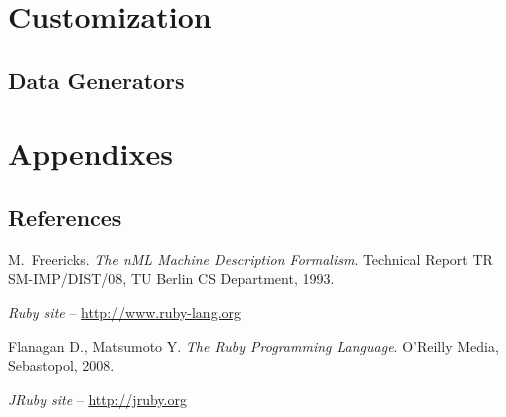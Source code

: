 \documentclass[oneside,final,12pt]{extreport}
\begin{document}
\chapter{Customization}

\section{Data Generators}


\chapter{Appendixes}

\section{References}



\begin{thebibliography}{1}

M.~Freericks.
\emph{The nML Machine Description Formalism}.
Technical Report TR SM-IMP/DIST/08, TU Berlin CS Department, 1993.

\emph{Ruby site} -- \url{http://www.ruby-lang.org}

Flanagan D., Matsumoto Y.
\emph{The Ruby Programming Language}.
O’Reilly Media, Sebastopol, 2008.

\emph{JRuby site} -- \url{http://jruby.org}

\end{thebibliography}
\end{document}
